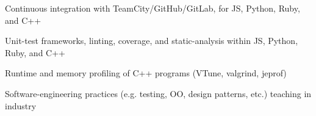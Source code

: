 \begin{plainlist}
	\item Continuous integration with TeamCity/GitHub/GitLab, for JS, Python, Ruby, and C++
	\item Unit-test frameworks, linting, coverage, and static-analysis within JS, Python, Ruby, and C++
	\item Runtime and memory profiling of C++ programs (VTune, valgrind, jeprof)
	\item Software-engineering practices (e.g. testing, OO, design patterns, etc.) teaching in industry
\end{plainlist}
